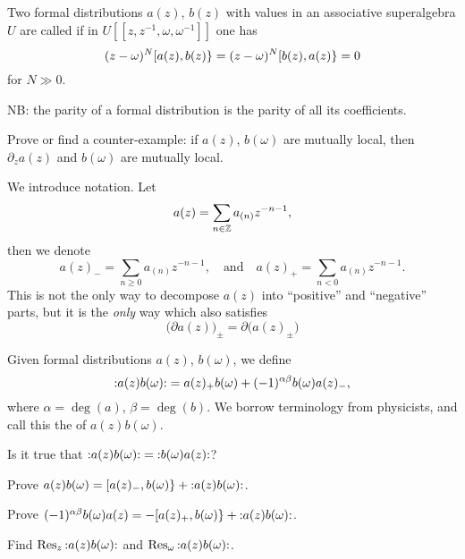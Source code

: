 Two formal distributions $a(z)$, $b(z)$ with values in an associative
superalgebra $U$ are called  if in
$U[[z,z^{-1},\omega,\omega^{-1}]]$ one has
\begin{equation}
(z-\omega)^N\superb{a(z)}{b(z)}=(z-\omega)^N\superb{b(z)}{a(z)}=0
\end{equation}
for $N\gg0$.

NB: the parity of a formal distribution is the parity of all its
coefficients.

\begin{xca}
Prove or find a counter-example: if $a(z)$, $b(\omega)$ are mutually
local, then $\partial_{z}a(z)$ and $b(\omega)$ are mutually local.
\end{xca}

\M
We introduce notation.
Let
\begin{equation}
a(z)=\sum_{n\in\ZZ}a_{(n)}z^{-n-1},
\end{equation}
then we denote
\begin{equation}
a(z)_{-}=\sum_{n\geq0}a_{(n)}z^{-n-1},
\quad\mbox{and}\quad
a(z)_{+}=\sum_{n<0}a_{(n)}z^{-n-1}.
\end{equation}
This is not the only way to decompose $a(z)$ into ``positive'' and
``negative'' parts, but it is the \emph{only} way which also satisfies
\begin{equation}
\bigl(\partial a(z)\bigr)_{\pm}=\partial\bigl(a(z)_{\pm}\bigr)
\end{equation}

Given formal distributions $a(z)$, $b(\omega)$, we define
\begin{equation}
\normOrd{a(z)b(\omega)} = a(z)_{+}b(\omega)+(-1)^{\alpha\beta}b(\omega)a(z)_{-},
\end{equation}
where $\alpha=\deg(a)$, $\beta=\deg(b)$. We borrow terminology from
physicists, and call this the  of $a(z)b(\omega)$.

\begin{xca}
Is it true that $\normOrd{a(z)b(\omega)}=\normOrd{b(\omega)a(z)}$?
\end{xca}
\begin{xca}
Prove
$a(z)b(\omega)=\superb{a(z)_{-}}{b(\omega)}+\normOrd{a(z)b(\omega)}$.
\end{xca}
\begin{xca}
Prove
$(-1)^{\alpha\beta}b(\omega)a(z)=-\superb{a(z)_{+}}{b(\omega)}+\normOrd{a(z)b(\omega)}$.
\end{xca}
\begin{xca}
Find $\Res[z]{\normOrd{a(z)b(\omega)}}$ and 
$\Res[\omega]{\normOrd{a(z)b(\omega)}}$.
\end{xca}

